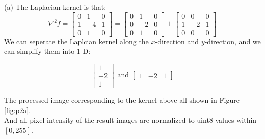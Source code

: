 \problem{}
(a) The Laplacian kernel is that:
$$
\nabla^2 f = \begin{bmatrix}
    0 & 1 & 0 \\
    1 & -4 & 1 \\
    0 & 1 & 0
\end{bmatrix}
=
\begin{bmatrix}
    0 & 1 & 0 \\
    0 & -2 & 0 \\
    0 & 1 & 0
\end{bmatrix}
+
\begin{bmatrix}
    0 & 0 & 0 \\
    1 & -2 & 1 \\
    0 & 0 & 0
\end{bmatrix}
$$
We can seperate the Laplcian kernel along the $x$-direction and $y$-direction, and we can simplify them into 1-D:

$$\begin{bmatrix}1\\-2\\1\end{bmatrix} \text{\ \ and \ \ } \begin{bmatrix}1 & -2 & 1\end{bmatrix}$$

The processed image corresponding to the kernel above all shown in Figure \ref{fig:p2a}.\\
And all pixel intensity of the result images are normalized to uint8 values within $[0,255]$.\\

